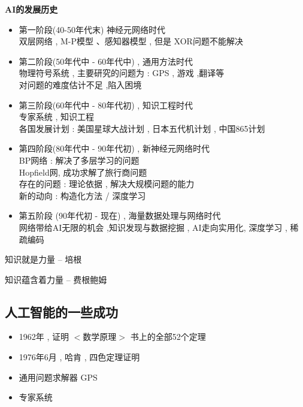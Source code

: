\documentclass[UTF8,a4paper]{ctexart}
\begin{document}
\textbf{AI的发展历史}
\begin{itemize}
	\item 第一阶段(40-50年代末) 神经元网络时代\\
	      双层网络 , M-P模型 、感知器模型 , 但是 XOR问题不能解决
	\item 第二阶段(50年代中 - 60年代中) , 通用方法时代\\
	      物理符号系统 , 主要研究的问题为 : GPS , 游戏 ,翻译等\\
	      对问题的难度估计不足 ,陷入困境
	\item 第三阶段(60年代中 - 80年代初) , 知识工程时代 \\
	      专家系统 , 知识工程 \\
	      各国发展计划 : 美国星球大战计划 , 日本五代机计划 , 中国865计划
	\item 第四阶段(80年代中 - 90年代初) , 新神经元网络时代 \\
	      BP网络 : 解决了多层学习的问题 \\
	      Hopfield网, 成功求解了旅行商问题\\
	      存在的问题 : 理论依据 , 解决大规模问题的能力\\
	      新的动向 : 构造化方法 / 深度学习
	\item 第五阶段 (90年代初 - 现在) , 海量数据处理与网络时代 \\
	      网络带给AI无限的机会 ,知识发现与数据挖掘 , AI走向实用化, 深度学习 , 稀疏编码
\end{itemize}

知识就是力量 -- 培根

知识蕴含着力量 -- 费根鲍姆

\subsection{人工智能的一些成功}

\begin{itemize}
	\item 1962年 , 证明 $<$数学原理$>$ 书上的全部52个定理
	\item 1976年6月 , 哈肯 , 四色定理证明
	\item 通用问题求解器 GPS
	\item 专家系统
\end{itemize}
\end{document}
